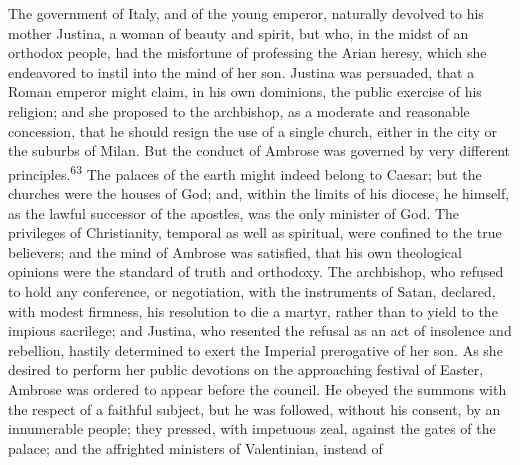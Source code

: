


The government of Italy, and of the young emperor, naturally
devolved to his mother Justina, a woman of beauty and spirit, but
who, in the midst of an orthodox people, had the misfortune of
professing the Arian heresy, which she endeavored to instil into
the mind of her son. Justina was persuaded, that a Roman emperor
might claim, in his own dominions, the public exercise of his
religion; and she proposed to the archbishop, as a moderate and
reasonable concession, that he should resign the use of a single
church, either in the city or the suburbs of Milan. But the
conduct of Ambrose was governed by very different principles.\textsuperscript{63}
The palaces of the earth might indeed belong to Caesar; but the
churches were the houses of God; and, within the limits of his
diocese, he himself, as the lawful successor of the apostles, was
the only minister of God. The privileges of Christianity,
temporal as well as spiritual, were confined to the true
believers; and the mind of Ambrose was satisfied, that his own
theological opinions were the standard of truth and orthodoxy.
The archbishop, who refused to hold any conference, or
negotiation, with the instruments of Satan, declared, with modest
firmness, his resolution to die a martyr, rather than to yield to
the impious sacrilege; and Justina, who resented the refusal as
an act of insolence and rebellion, hastily determined to exert
the Imperial prerogative of her son. As she desired to perform
her public devotions on the approaching festival of Easter,
Ambrose was ordered to appear before the council. He obeyed the
summons with the respect of a faithful subject, but he was
followed, without his consent, by an innumerable people; they
pressed, with impetuous zeal, against the gates of the palace;
and the affrighted ministers of Valentinian, instead of
